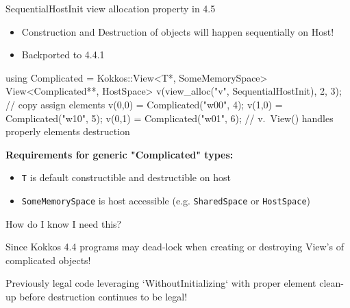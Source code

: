 \begin{frame}[fragile]{SequentialHostInit view allocation property in 4.5}

\begin{itemize}
\item Construction and Destruction of objects will happen sequentially on Host!
\item Backported to 4.4.1
\end{itemize}

\begin{code}
using Complicated = Kokkos::View<T*, SomeMemorySpace>
View<Complicated**, HostSpace> v(view_alloc("v", SequentialHostInit), 2, 3);
// copy assign elements
v(0,0) = Complicated("w00", 4);
v(1,0) = Complicated("w10", 5);
v(0,1) = Complicated("w01", 6);
// v.~View() handles properly elements destruction
\end{code}

\vspace{10pt}
\textbf{Requirements for generic "Complicated" types:}
\begin{itemize}
\item \texttt{T} is default constructible and destructible on host
\item \texttt{SomeMemorySpace} is host accessible (e.g. \texttt{SharedSpace} or \texttt{HostSpace})
\end{itemize}
\end{frame}


\begin{frame}[fragile]{How do I know I need this?}
\begin{center}
Since Kokkos 4.4 programs may dead-lock when creating or destroying View's of complicated objects!
\end{center}

\vspace{10pt}

Previously legal code leveraging `WithoutInitializing` with proper element clean-up before destruction continues to be legal!
\end{frame}


